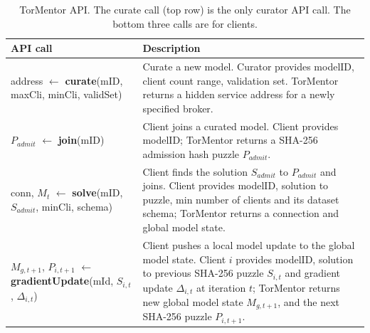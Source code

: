 
\begin{table}[t]
\begin{tabular}{ p{7cm} p{10cm} }
 \hline
 \textbf{API call}                                                 & 
 \textbf{Description}                                                                 \\
 \hline
 address $\leftarrow$ \textbf{curate}(mID, maxCli, minCli, validSet) & 
 Curate a new model. Curator provides modelID,  
 client count range, validation set. TorMentor returns a hidden
 service address for a newly specified broker. \\
 \hline\hline
 $P_{admit}$ $\leftarrow$ \textbf{join}(mID)                         
 &
 Client joins a curated model. Client provides modelID; TorMentor returns
 a SHA-256 admission hash puzzle $P_{admit}$.                          
 \\
 \hline
 conn, $M_t$ $\leftarrow$ \textbf{solve}(mID, $S_{admit}$, minCli, schema) & 
 Client finds the solution $S_{admit}$ to $P_{admit}$ and joins. Client
 provides modelID, solution to puzzle, min number of clients and its
 dataset schema; TorMentor returns a connection and global model state.
 \\
 \hline
 $M_{g,t+1}$, $P_{i,t+1}$ $\leftarrow$ \textbf{gradientUpdate}(mId, $S_
 {i,t}$, $\Delta_{i,t}$) & 
 Client pushes a local model update to the global model state. Client $i$
 provides modelID, solution to previous SHA-256 puzzle $S_{i,t}$ and
 gradient update $\Delta_{i,t}$ at iteration $t$; TorMentor returns new
 global model state $M_{g,t+1}$, and the next SHA-256 puzzle $P_
 {i,t+1}$.          
 \\
\end{tabular} 
\caption{TorMentor API. The curate call (top row) is the only curator
  API call. The bottom three calls are for clients.\label{tab:API} }
\end{table}

